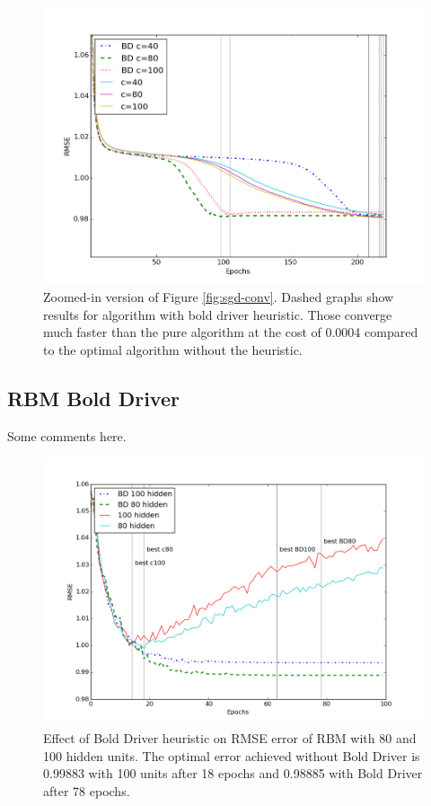 \documentclass[10pt,conference,compsocconf]{IEEEtran}
\begin{document}
\begin{figure}[htbp]
  \centering
  \includegraphics[width=\columnwidth]{convergence_zoom_all.png}
  \caption{Zoomed-in version of Figure \ref{fig:sgd-conv}. Dashed graphs show results for algorithm with bold driver heuristic. Those converge much faster than the pure algorithm at the cost of 0.0004 compared to the optimal algorithm without the heuristic.}
  \label{fig:sgd-conv-zoom}
\end{figure} 
 
\subsection{RBM Bold Driver}
Some comments here.


\begin{figure}[htbp]
  \centering
  \includegraphics[width=\columnwidth]{conv_rbm_all.png}
  \caption{Effect of Bold Driver heuristic on RMSE error of RBM with 80 and 100 hidden units. The optimal error achieved without Bold Driver is 0.99883 with 100 units after 18 epochs and 0.98885 with Bold Driver after 78 epochs.}
  \label{fig:sgd-conv-zoom}
\end{figure} 
\end{document}
